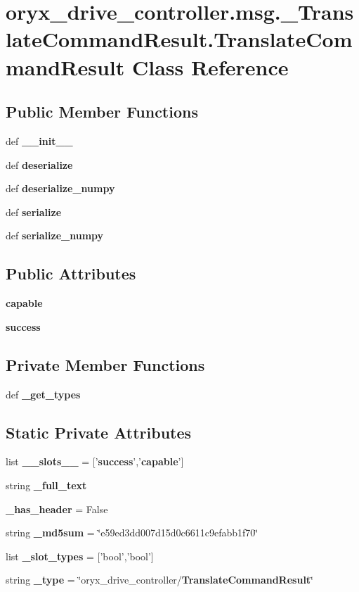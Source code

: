 \section{oryx\-\_\-drive\-\_\-controller.\-msg.\-\_\-\-Translate\-Command\-Result.\-Translate\-Command\-Result \-Class \-Reference}
\label{classoryx__drive__controller_1_1msg_1_1__TranslateCommandResult_1_1TranslateCommandResult}
\subsection*{\-Public \-Member \-Functions}
\begin{DoxyCompactItemize}
\item 
def {\bf \-\_\-\-\_\-init\-\_\-\-\_\-}
\item 
def {\bf deserialize}
\item 
def {\bf deserialize\-\_\-numpy}
\item 
def {\bf serialize}
\item 
def {\bf serialize\-\_\-numpy}
\end{DoxyCompactItemize}
\subsection*{\-Public \-Attributes}
\begin{DoxyCompactItemize}
\item 
{\bf capable}
\item 
{\bf success}
\end{DoxyCompactItemize}
\subsection*{\-Private \-Member \-Functions}
\begin{DoxyCompactItemize}
\item 
def {\bf \-\_\-get\-\_\-types}
\end{DoxyCompactItemize}
\subsection*{\-Static \-Private \-Attributes}
\begin{DoxyCompactItemize}
\item 
list {\bf \-\_\-\-\_\-slots\-\_\-\-\_\-} = ['{\bf success}','{\bf capable}']
\item 
string {\bf \-\_\-full\-\_\-text}
\item 
{\bf \-\_\-has\-\_\-header} = \-False
\item 
string {\bf \-\_\-md5sum} = \char`\"{}e59ed3dd007d15d0c6611c9efabb1f70\char`\"{}
\item 
list {\bf \-\_\-slot\-\_\-types} = ['bool','bool']
\item 
string {\bf \-\_\-type} = \char`\"{}oryx\-\_\-drive\-\_\-controller/{\bf \-Translate\-Command\-Result}\char`\"{}
\end{DoxyCompactItemize}


